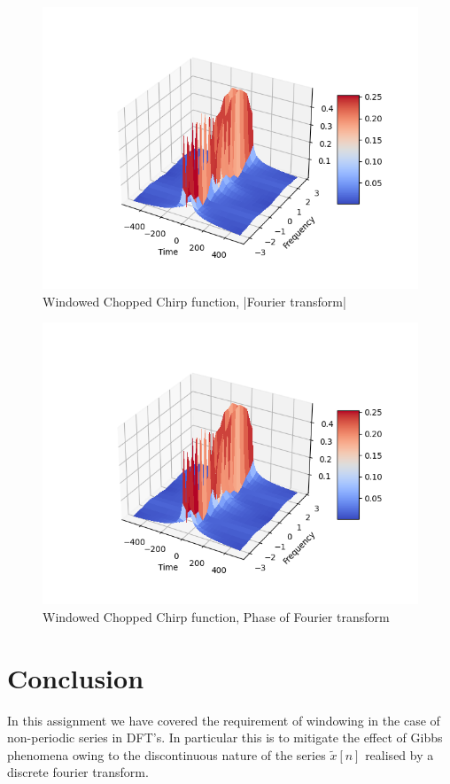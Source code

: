 \documentclass{article}
\begin{document}
\begin{figure}[h!]
\centering
\includegraphics[scale=0.6]{chirp_mag.png}
\caption{Windowed Chopped Chirp function, |Fourier transform|}
\label{fig:universe}
\end{figure}

\begin{figure}[h!]
\centering
\includegraphics[scale=0.6]{chirp_mag.png}
\caption{Windowed Chopped Chirp function, Phase of Fourier transform}
\label{fig:universe}
\end{figure}


\section{Conclusion}
In this assignment we have covered the requirement of windowing in the case of non-periodic series in DFT's. In particular this is to mitigate the effect of Gibbs phenomena owing to the discontinuous nature of the series $\tilde{x}[n]$ realised by a discrete fourier transform.
\end{document}
